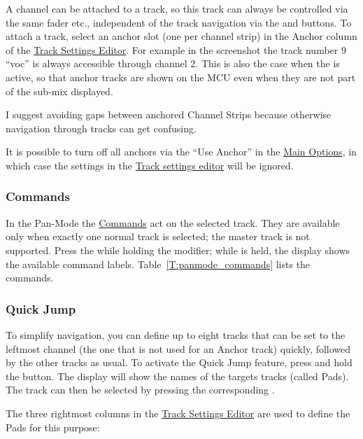 A channel can be attached to a track, so this track can always be
controlled via the same fader etc., independent of the track
navigation via the \bankdu and \channeldu buttons. To attach a track,
select an anchor slot (one per channel strip) in the Anchor column of the
\hyperref[F:Screenshot_Track_Mode]{Track Settings Editor}. For example
in the screenshot the track number 9 ``voc'' is always accessible through
channel 2. This is also the case when the \foldermode is active, so that
anchor tracks are shown on the MCU even when they are not part of the 
sub-mix displayed.

I suggest avoiding gaps between anchored Channel Strips because otherwise navigation
through tracks can get confusing.

It is possible to turn off all anchors via the ``Use Anchor''
\attribute in the \hyperref[T:multitrack_options1]{Main Options}, in
which case the settings in the
\hyperref[F:Screenshot_Track_Mode]{Track settings editor} will be
ignored.

\subsubsection{Commands}\label{pancommands}
In the Pan-Mode the \hyperref[commands]{Commands} act on the selected track.
They are available only when exactly one normal track is selected; the master
track is not supported. Press the \vpot while holding the \control modifier;
while \control is held, the display shows the available command labels.
Table~\ref{T:panmode_commands} lists the commands.


\subsubsection{Quick Jump}\label{quickjump}

To simplify navigation, you can define up to eight tracks that can be
set to the leftmost channel (the one that is not used for an Anchor track)
quickly, followed by the other tracks as usual. To activate the Quick
Jump feature, press and hold the \pan button. The display will show
the names of the targets tracks (called Pads). The track can then be
selected by pressing the corresponding \vpot.

The three rightmost columns in the
\hyperref[F:Screenshot_Track_Mode]{Track Settings Editor} are used to define the
Pads for this purpose:

